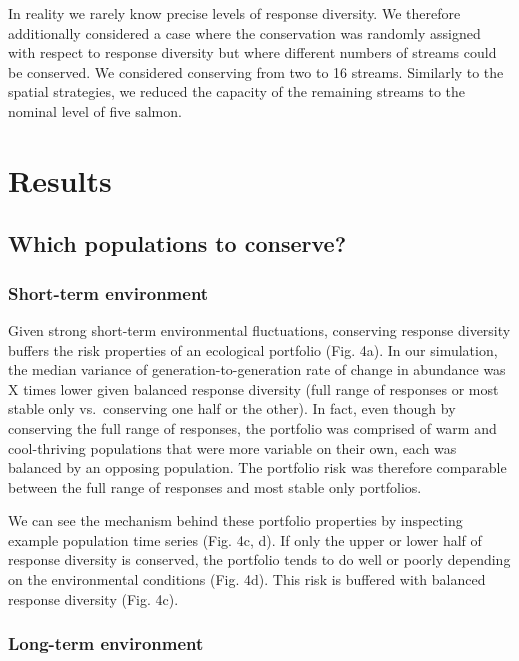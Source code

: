 In reality we rarely know precise levels of response diversity. We
therefore additionally considered a case where the conservation was
randomly assigned with respect to response diversity but where different
numbers of streams could be conserved. We considered conserving from two
to 16 streams. Similarly to the spatial strategies, we reduced the
capacity of the remaining streams to the nominal level of five salmon.

\section{Results}

\subsection{Which populations to conserve?}

\subsubsection{Short-term environment}

Given strong short-term environmental fluctuations, conserving response
diversity buffers the risk properties of an ecological portfolio (Fig.
4a). In our simulation, the median variance of generation-to-generation
rate of change in abundance was X times lower given balanced response
diversity (full range of responses or most stable only vs.~conserving
one half or the other). In fact, even though by conserving the full
range of responses, the portfolio was comprised of warm and
cool-thriving populations that were more variable on their own, each was
balanced by an opposing population. The portfolio risk was therefore
comparable between the full range of responses and most stable only
portfolios.

We can see the mechanism behind these portfolio properties by inspecting
example population time series (Fig. 4c, d). If only the upper or lower
half of response diversity is conserved, the portfolio tends to do well
or poorly depending on the environmental conditions (Fig. 4d). This risk
is buffered with balanced response diversity (Fig. 4c).

\subsubsection{Long-term environment}

